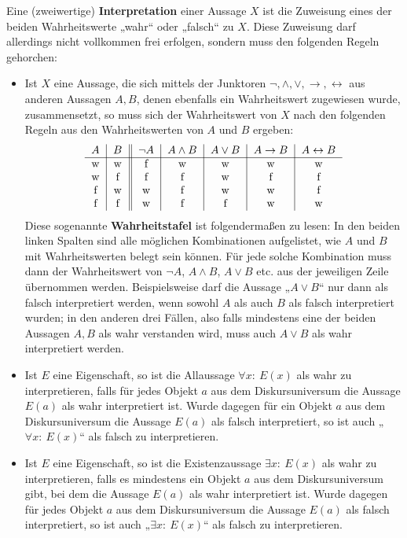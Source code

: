\begin{de}[Interpretation] \label{interpretation}
 Eine (zweiwertige) \textbf{Interpretation} einer Aussage $X$ ist die Zuweisung eines der beiden Wahrheitswerte „wahr“ oder „falsch“ zu $X$. Diese Zuweisung darf allerdings nicht vollkommen frei erfolgen, sondern muss den folgenden Regeln gehorchen:
 \begin{itemize}
  \item  Ist $X$ eine Aussage, die sich mittels der Junktoren $\neg,\land,\lor,\to,\leftrightarrow$ aus anderen Aussagen $A,B$, denen ebenfalls ein Wahrheitswert zugewiesen wurde, zusammensetzt, so muss sich der Wahrheitswert von $X$ nach den folgenden Regeln aus den Wahrheitswerten von $A$ und $B$ ergeben:
		\[\begin{tabular}{c|c||c|c|c|c|c}
			$A$ & $B$ & $\neg A$ & $A\land B$ & $A\lor B$ & $A\to B$ & $A\leftrightarrow B$ \\
			\hline
			w&w&f & w & w & w & w\\
			w&f&f & f & w & f & f\\
			f&w&w & f & w & w & f\\
			f&f&w & f & f & w & w\\
		\end{tabular}\]
Diese sogenannte \textbf{Wahrheitstafel} ist folgendermaßen zu lesen: In den beiden linken Spalten sind alle möglichen Kombinationen aufgelistet, wie $A$ und $B$ mit Wahrheitswerten belegt sein können. Für jede solche Kombination muss dann der Wahrheitswert von $\neg A$, $A\land B$, $A\lor B$ etc. aus der jeweiligen Zeile übernommen werden. Beispielsweise darf die Aussage „$A\lor B$“ nur dann als falsch interpretiert werden, wenn sowohl $A$ als auch $B$ als falsch interpretiert wurden; in den anderen drei Fällen, also falls mindestens eine der beiden Aussagen $A,B$ als wahr verstanden wird, muss auch $A\lor B$ als wahr interpretiert werden.
\item Ist $E$ eine Eigenschaft, so ist die Allaussage $\forall x:\ E(x)$ als wahr zu interpretieren, falls für jedes Objekt $a$ aus dem Diskursuniversum die Aussage $E(a)$ als wahr interpretiert ist. Wurde dagegen für ein Objekt $a$ aus dem Diskursuniversum die Aussage $E(a)$ als falsch interpretiert, so ist auch „$\forall x:\ E(x)$“ als falsch zu interpretieren.
\item Ist $E$ eine Eigenschaft, so ist die Existenzaussage $\exists x:\ E(x)$ als wahr zu interpretieren, falls es mindestens ein Objekt $a$ aus dem Diskursuniversum gibt, bei dem die Aussage $E(a)$ als wahr interpretiert ist. Wurde dagegen für jedes Objekt $a$ aus dem Diskursuniversum die Aussage $E(a)$ als falsch interpretiert, so ist auch „$\exists x:\ E(x)$“ als falsch zu interpretieren.
 \end{itemize}
\end{de}



